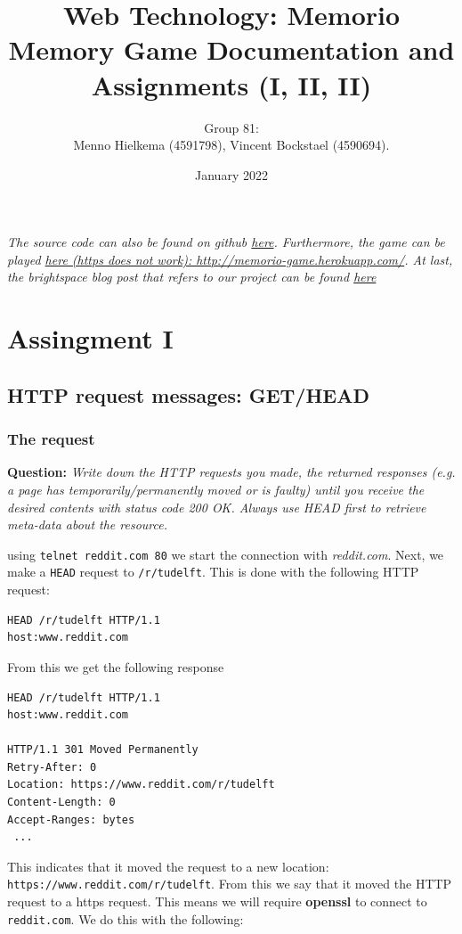 \documentclass{article}
\title{Web Technology: Memorio \\ 
\large Memory Game Documentation and Assignments (I, II, II)}
\author{
    Group 81:\\
    Menno Hielkema (4591798), Vincent Bockstael (4590694).
}
\date{January 2022}
\begin{document}
\maketitle

\textit{The source code can also be found on github \href{https://github.com/mennohie/memory-project-webdb/}{here}. Furthermore, the game can be played \href{http://memorio-game.herokuapp.com/}{here (https does not work): http://memorio-game.herokuapp.com/}. At last, the brightspace blog post that refers to our project can be found \href{https://brightspace.tudelft.nl/d2l/le/399713/discussions/threads/115930/View?searchText=81}{here}}


\section{Assingment I}

\subsection{HTTP request messages: GET/HEAD}
\subsubsection{The request}

\textbf{Question:} \textit{Write down the HTTP requests you made, the returned responses (e.g. a page has temporarily/permanently moved or is faulty) until you receive the desired contents with status code 200 OK. Always use HEAD first to retrieve meta-­data about the resource.}

using \texttt{telnet reddit.com 80} we start the connection with \textit{reddit.com}. Next, we make a \texttt{HEAD} request to \texttt{/r/tudelft}. This is done with the following HTTP request:

\begin{lstlisting}[]
HEAD /r/tudelft HTTP/1.1
host:www.reddit.com
\end{lstlisting}

From this we get the following response


\begin{lstlisting}[]
HEAD /r/tudelft HTTP/1.1
host:www.reddit.com

HTTP/1.1 301 Moved Permanently
Retry-After: 0
Location: https://www.reddit.com/r/tudelft
Content-Length: 0
Accept-Ranges: bytes
 ...
\end{lstlisting}

This indicates that it moved the request to a new location: \texttt{https://www.reddit.com/r/tudelft}. From this we say that it moved the HTTP request to a https request. This means we will require \textbf{openssl} to connect to \texttt{reddit.com}. We do this with the following:
\end{document}
